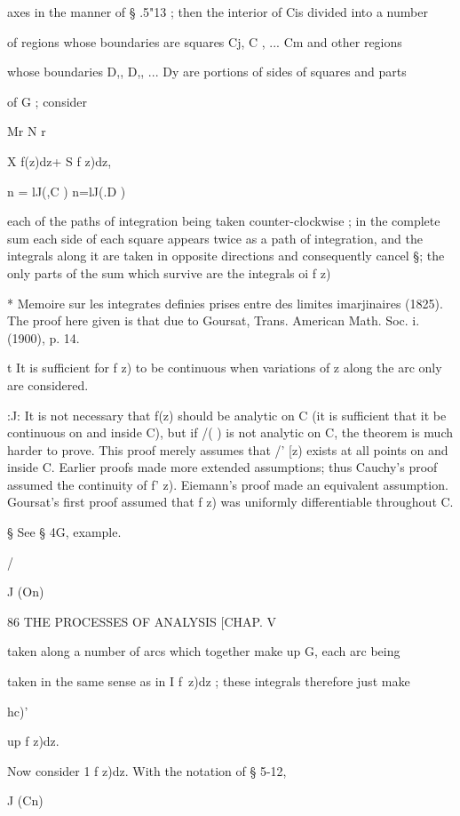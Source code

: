 axes in the manner of § .5"13 ; then the interior of Cis divided into a number 

of regions whose boundaries are squares Cj, C , ... Cm and other regions 

whose boundaries D,, D,, ... Dy are portions of sides of squares and parts 

of G ; consider 

Mr N r 

X f(z)dz+ S f z)dz, 

n = lJ(,C ) n=lJ(.D ) 

each of the paths of integration being taken counter-clockwise ; in the 
complete sum each side of each square appears twice as a path of integration, 
and the integrals along it are taken in opposite directions and consequently 
cancel §; the only parts of the sum which survive are the integrals oi f z) 

* Memoire sur les integrates definies prises entre des limites imarjinaires (1825). The proof 
here given is that due to Goursat, Trans. American Math. Soc. i. (1900), p. 14. 

t It is sufficient for f  z) to be continuous when variations of z along the arc only are 
considered. 

:J: It is not necessary that f(z) should be analytic on C (it is sufficient that it be continuous 
on and inside C), but if /( ) is not analytic on C, the theorem is much harder to prove. This 
proof merely assumes that /' [z) exists at all points on and inside C. Earlier proofs made more 
extended assumptions; thus Cauchy's proof assumed the continuity of f' z). Eiemann's 
proof made an equivalent assumption. Goursat's first proof assumed that f z) was uniformly 
differentiable throughout C. 

§ See § 4G, example. 



/   

J (On) 



86 THE PROCESSES OF ANALYSIS [CHAP. V 

taken along a number of arcs which together make up G, each arc being 

taken in the same sense as in I f\ z)dz ; these integrals therefore just make 

hc)' 

up f z)dz. 

Now consider 1 f z)dz. With the notation of § 5-12, 

J (Cn) 

